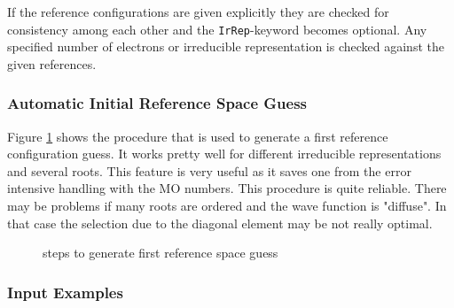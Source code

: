 \bigskip

If the reference configurations are given explicitly they are checked for
consistency among each other and the {\tt IrRep}-keyword becomes optional. Any
specified number of electrons or irreducible representation is checked against
the given references.


\subsubsection{Automatic Initial Reference Space Guess}
Figure \ref{SpaceGuess} shows the procedure that is used to generate
a first reference configuration guess. It works pretty well for different
irreducible representations and several roots.
This feature is very useful as it saves
one from the error intensive handling with the MO numbers.
This procedure is quite reliable. There may be problems if many roots
are ordered and the wave function is "diffuse". In that case
the selection due to the diagonal element may be not really optimal.
\begin{figure}[h]
\begin{center}

\end{center}
\caption{steps to generate first reference space guess}
\label{SpaceGuess}
\end{figure}


\subsubsection{Input Examples}

